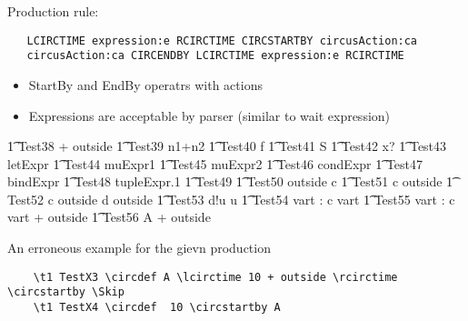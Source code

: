 \documentclass{article}
\begin{document}
Production rule:
\begin{verbatim}
   LCIRCTIME expression:e RCIRCTIME CIRCSTARTBY circusAction:ca
   circusAction:ca CIRCENDBY LCIRCTIME expression:e RCIRCTIME
\end{verbatim}

\begin{itemize}
	\item StartBy and EndBy operatrs with actions
	\item Expressions are acceptable by parser (similar to wait expression)
\end{itemize}
%
\begin{circusaction}
   \t1 Test38 \circdef {} + outside \rcirctime \circstartby \Skip
   \also
   \t1 Test39 \circdef \lcirctime n1+n2 \rcirctime \circstartby \Skip 
   \also
   \t1 Test40 \circdef \lcirctime f \rcirctime \circstartby \Skip
   \also
   \t1 Test41 \circdef \lcirctime \theta S \rcirctime \circstartby \Skip
   \also
   \t1 Test42 \circdef \lcirctime x? \rcirctime \circstartby \Skip
   \also
   \t1 Test43 \circdef \lcirctime letExpr \rcirctime \circstartby \Skip
   \also
   \t1 Test44 \circdef \lcirctime muExpr1 \rcirctime \circstartby \Skip
   \also
   \t1 Test45 \circdef \lcirctime muExpr2 \rcirctime \circstartby \Skip
   \also
   \t1 Test46 \circdef \lcirctime condExpr \rcirctime \circstartby \Skip
   \also
   \t1 Test47 \circdef \lcirctime bindExpr \rcirctime \circstartby \Skip
   \also
   \t1 Test48 \circdef \lcirctime tupleExpr.1 \rcirctime \circstartby \Skip
   \also
   \t1 Test49 \circdef {}   \rcirctime \circstartby \Skip
   \also
   \t1 Test50 \circdef \lcirctime outside  \rcirctime \circstartby c \then \Skip
   \also
   \t1 Test51 \circdef c \then \lcirctime outside  \rcirctime \circstartby \Skip
   \also
   \t1 Test52 \circdef c \then \lcirctime outside  \rcirctime \circstartby d \then \lcirctime    
   outside \rcirctime \circstartby \Skip
   \also
   \t1 Test53 \circdef d!u \then \lcirctime u  \rcirctime \circstartby \Skip
   \also
   \t1 Test54 \circdef  \circvres vart : \nat \circspot  c \then \lcirctime vart  \rcirctime 
   \circstartby \Skip
   \also
   \t1 Test55 \circdef  \circvres vart : \nat \circspot  c \then \lcirctime vart + outside  
   \rcirctime \circstartby \Skip
   \also
   \t1 Test56 \circdef  A \circseq {} + outside \rcirctime \circstartby \Skip 
\end{circusaction}

An erroneous example for the gievn production 
\begin{verbatim}
	\t1 TestX3 \circdef A \lcirctime 10 + outside \rcirctime \circstartby \Skip 
	\t1 TestX4 \circdef  10 \circstartby A 
\end{verbatim}
\end{document}
